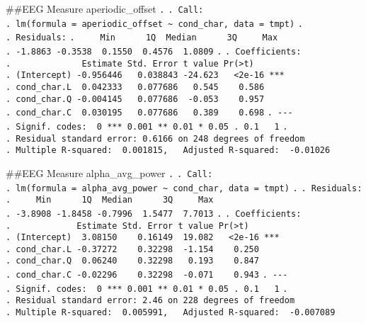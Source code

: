 \documentclass[
]{article}
\begin{document}
\#\#EEG Measure aperiodic\_offset \texttt{.} \texttt{.\ Call:}
\texttt{.\ lm(formula\ =\ aperiodic\_offset\ \textasciitilde{}\ cond\_char,\ data\ =\ tmpt)}
\texttt{.} \texttt{.\ Residuals:}
\texttt{.\ \ \ \ \ Min\ \ \ \ \ \ 1Q\ \ Median\ \ \ \ \ \ 3Q\ \ \ \ \ Max}
\texttt{.\ -1.8863\ -0.3538\ \ 0.1550\ \ 0.4576\ \ 1.0809} \texttt{.}
\texttt{.\ Coefficients:}
\texttt{.\ \ \ \ \ \ \ \ \ \ \ \ \ \ Estimate\ Std.\ Error\ t\ value\ Pr(\textgreater{}\textbar{}t\textbar{})}
\texttt{.\ (Intercept)\ -0.956446\ \ \ 0.038843\ -24.623\ \ \ \textless{}2e-16\ ***}
\texttt{.\ cond\_char.L\ \ 0.042333\ \ \ 0.077686\ \ \ 0.545\ \ \ \ 0.586}
\texttt{.\ cond\_char.Q\ -0.004145\ \ \ 0.077686\ \ -0.053\ \ \ \ 0.957}
\texttt{.\ cond\_char.C\ \ 0.030195\ \ \ 0.077686\ \ \ 0.389\ \ \ \ 0.698}
\texttt{.\ -\/-\/-}
\texttt{.\ Signif.\ codes:\ \ 0\ \textquotesingle{}***\textquotesingle{}\ 0.001\ \textquotesingle{}**\textquotesingle{}\ 0.01\ \textquotesingle{}*\textquotesingle{}\ 0.05\ \textquotesingle{}.\textquotesingle{}\ 0.1\ \textquotesingle{}\ \textquotesingle{}\ 1}
\texttt{.}
\texttt{.\ Residual\ standard\ error:\ 0.6166\ on\ 248\ degrees\ of\ freedom}
\texttt{.\ Multiple\ R-squared:\ \ 0.001815,\ \ \ Adjusted\ R-squared:\ \ -0.01026}

\#\#EEG Measure alpha\_avg\_power \texttt{.} \texttt{.\ Call:}
\texttt{.\ lm(formula\ =\ alpha\_avg\_power\ \textasciitilde{}\ cond\_char,\ data\ =\ tmpt)}
\texttt{.} \texttt{.\ Residuals:}
\texttt{.\ \ \ \ \ Min\ \ \ \ \ \ 1Q\ \ Median\ \ \ \ \ \ 3Q\ \ \ \ \ Max}
\texttt{.\ -3.8908\ -1.8458\ -0.7996\ \ 1.5477\ \ 7.7013} \texttt{.}
\texttt{.\ Coefficients:}
\texttt{.\ \ \ \ \ \ \ \ \ \ \ \ \ Estimate\ Std.\ Error\ t\ value\ Pr(\textgreater{}\textbar{}t\textbar{})}
\texttt{.\ (Intercept)\ \ 3.08150\ \ \ \ 0.16149\ \ 19.082\ \ \ \textless{}2e-16\ ***}
\texttt{.\ cond\_char.L\ -0.37272\ \ \ \ 0.32298\ \ -1.154\ \ \ \ 0.250}
\texttt{.\ cond\_char.Q\ \ 0.06240\ \ \ \ 0.32298\ \ \ 0.193\ \ \ \ 0.847}
\texttt{.\ cond\_char.C\ -0.02296\ \ \ \ 0.32298\ \ -0.071\ \ \ \ 0.943}
\texttt{.\ -\/-\/-}
\texttt{.\ Signif.\ codes:\ \ 0\ \textquotesingle{}***\textquotesingle{}\ 0.001\ \textquotesingle{}**\textquotesingle{}\ 0.01\ \textquotesingle{}*\textquotesingle{}\ 0.05\ \textquotesingle{}.\textquotesingle{}\ 0.1\ \textquotesingle{}\ \textquotesingle{}\ 1}
\texttt{.}
\texttt{.\ Residual\ standard\ error:\ 2.46\ on\ 228\ degrees\ of\ freedom}
\texttt{.\ Multiple\ R-squared:\ \ 0.005991,\ \ \ Adjusted\ R-squared:\ \ -0.007089}
\end{document}
